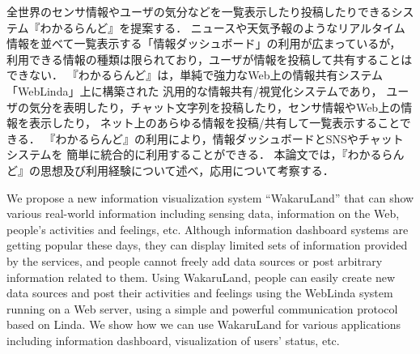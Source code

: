 \begin{jabstract}
  全世界のセンサ情報やユーザの気分などを一覧表示したり投稿したりできるシステム『\textsf{わかるらんど}』を提案する．
  ニュースや天気予報のようなリアルタイム情報を並べて一覧表示する「情報ダッシュボード」の利用が広まっているが，
  利用できる情報の種類は限られており，ユーザが情報を投稿して共有することはできない．
  『わかるらんど』は，単純で強力なWeb上の情報共有システム「WebLinda」上に構築された
  汎用的な情報共有/視覚化システムであり，
  ユーザの気分を表明したり，チャット文字列を投稿したり，センサ情報やWeb上の情報を表示したり，
  ネット上のあらゆる情報を投稿/共有して一覧表示することできる．
  『わかるらんど』の利用により，情報ダッシュボードとSNSやチャットシステムを
  簡単に統合的に利用することができる．
  本論文では，『わかるらんど』の思想及び利用経験について述べ，応用について考察する．
\end{jabstract}



\begin{eabstract}
  We propose a new information visualization system ``WakaruLand'' that can show
  various real-world information including sensing data, information on the Web,
  people's activities and feelings, etc.
  Although information dashboard systems are getting popular these days,
  they can display limited sets of information provided by the services,
  and people cannot freely add data sources or post arbitrary
  information related to them.
  Using WakaruLand, people can easily create new data sources and
  post their activities and feelings using the WebLinda system
  running on a Web server,
  using a simple and powerful communication protocol based on Linda.
  We show how we can use WakaruLand for various applications
  including information dashboard, visualization of users' status, etc.
\end{eabstract}
